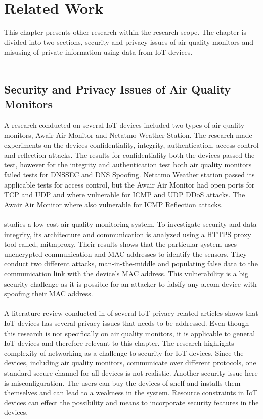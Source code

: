 \chapter*{Related Work}
This chapter presents other research within the research scope. The chapter is divided into two sections, security and privacy issues of air quality monitors and misusing of private information using data from IoT devices. \\\\
\section*{Security and Privacy Issues of Air Quality Monitors}
A research conducted on several IoT devices included two types of air quality monitors, Awair Air Monitor and Netatmo Weather Station. \cite{IoTSecurityandPrivacyImpl} The research made experiments on the devices confidentiality, integrity, authentication, access control and reflection attacks. The results for confidentiality both the devices passed the test, however for the integrity and authentication test both air quality monitors failed tests for DNSSEC and DNS Spoofing. Netatmo Weather station passed its applicable tests for access control, but the Awair Air Monitor had open ports for TCP and UDP and where vulnerable for ICMP and UDP DDoS attacks. The Awair Air Monitor where also vulnerable for ICMP Reflection attacks. \cite{IoTSecurityandPrivacyImpl}
\\\\
\cite{SecurityAndDataIntInAQM} studies a low-cost air quality monitoring system. To investigate security and data integrity, its architecture and communication is analyzed using a HTTPS proxy tool called, mitmproxy. Their results shows that the particular system uses unencrypted communication and MAC addresses to identify the sensors. They conduct two different attacks, man-in-the-middle and populating false data to the communication link with the device's MAC address. This vulnerability is a big security challenge as it is possible for an attacker to falsify any a.com device with spoofing their MAC address. \cite{SecurityAndDataIntInAQM}
\\\\
A literature review conducted in \cite{PrivacyOnGeneralIoT} of several IoT privacy related articles shows that IoT devices has several privacy issues that needs to be addressed. Even though this research is not specifically on air quality monitors, it is applicable to general IoT devices and therefore relevant to this chapter. The research highlights complexity of networking as a challenge to security for IoT devices. Since the devices, including air quality monitors, communicate over different protocols, one standard secure channel for all devices is not realistic. Another security issue here is misconfiguration. The users can buy the devices of-shelf and installs them themselves and can lead to a weakness in the system. Resource constraints in IoT devices can effect the possibility and means to incorporate security features in the devices. \cite{PrivacyOnGeneralIoT}
